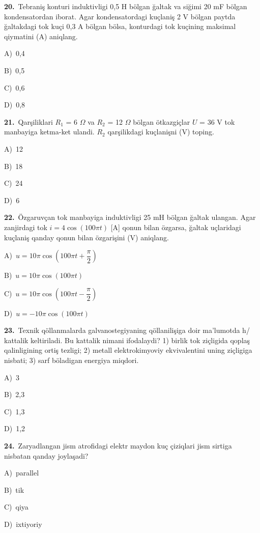 \documentclass[11pt,a4paper]{article}
\newcommand{\opt}[2]{\hspace*{4mm}#1)\ #2\par}
\begin{document}
\noindent\begin{minipage}{\linewidth}
\textbf{20.}\ Tebraniş konturi induktivligi 0,5 H bölgan ğaltak va siğimi 20 mF bölgan kondensatordan iborat. Agar kondensatordagi kuçlaniş 2 V bölgan paytda ğaltakdagi tok kuçi 0,3 A bölgan bölsa, konturdagi tok kuçining maksimal qiymatini (A) aniqlang.\par\smallskip
\opt{A}{0,4}
\opt{B}{0,5}
\opt{C}{0,6}
\opt{D}{0,8}
\end{minipage}\vspace{9pt}\par
\noindent\begin{minipage}{\linewidth}
\textbf{21.}\ Qarşiliklari $R_1$ = 6 $\Omega$ va $R_2$ = 12 $\Omega$ bölgan ötkazgiçlar $U$ = 36 V tok manbayiga ketma-ket ulandi. $R_2$ qarşilikdagi kuçlanişni (V) toping.\par\smallskip
\opt{A}{12}
\opt{B}{18}
\opt{C}{24}
\opt{D}{6}
\end{minipage}\vspace{9pt}\par
\noindent\begin{minipage}{\linewidth}
\textbf{22.}\ Özgaruvçan tok manbayiga induktivligi 25 mH bölgan ğaltak ulangan. Agar zanjirdagi tok $i = 4\cos(100\pi t)$ [A] qonun bilan özgarsa, ğaltak uçlaridagi kuçlaniş qanday qonun bilan özgarişini (V) aniqlang.\par\smallskip
\opt{A}{$u = 10\pi\cos(100\pi t + \dfrac{\pi}{2})$}
\opt{B}{$u = 10\pi\cos(100\pi t)$}
\opt{C}{$u = 10\pi\cos(100\pi t - \dfrac{\pi}{2})$}
\opt{D}{$u = -10\pi\cos(100\pi t)$}
\end{minipage}\vspace{9pt}\par
\noindent\begin{minipage}{\linewidth}
\textbf{23.}\ Texnik qöllanmalarda galvanostegiyaning qöllanilişiga doir ma’lumotda h/ kattalik keltiriladi. Bu kattalik nimani ifodalaydi? 1) birlik tok ziçligida qoplaş qalinligining ortiş tezligi; 2) metall elektrokimyoviy ekvivalentini uning ziçligiga nisbati; 3) sarf böladigan energiya miqdori.\par\smallskip
\opt{A}{3}
\opt{B}{2,3}
\opt{C}{1,3}
\opt{D}{1,2}
\end{minipage}\vspace{9pt}\par
\noindent\begin{minipage}{\linewidth}
\textbf{24.}\ Zaryadlangan jism atrofidagi elektr maydon kuç çiziqlari jism sirtiga nisbatan qanday joylaşadi?\par\smallskip
\opt{A}{parallel}
\opt{B}{tik}
\opt{C}{qiya}
\opt{D}{ixtiyoriy}
\end{minipage}\vspace{9pt}\par
\end{document}
